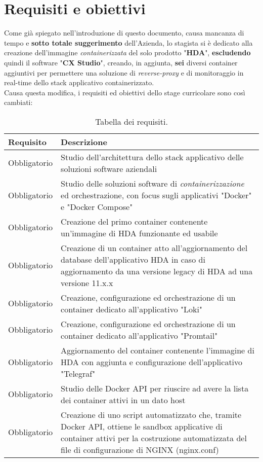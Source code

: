 \section{Requisiti e obiettivi}
Come già spiegato nell'introduzione di questo documento, causa mancanza di tempo e \textbf{sotto totale suggerimento} dell'Azienda, lo stagista si è dedicato alla creazione dell'immagine \textit{containerizzata} del solo prodotto "\textbf{HDA}", \textbf{escludendo} quindi il software "\textbf{CX Studio}", creando, in aggiunta, \textbf{sei} diversi container aggiuntivi per permettere una soluzione di \textit{reverse-proxy} e di monitoraggio in real-time dello stack applicativo containerizzato.\\
Causa questa modifica, i requisiti ed obiettivi dello stage curricolare sono così cambiati:

\begin{table}[h!]
\centering
    \renewcommand{\arraystretch}{1.5}
    \begin{tabular}{|m{}|m{}|} 
    \hline
        \hfil \textbf{Requisito} & \hfil \textbf{Descrizione} \\
    \hline\hline
        \hfil Obbligatorio & Studio dell'architettura dello stack applicativo delle soluzioni software aziendali  \\
    \hline
        \hfil Obbligatorio & Studio delle soluzioni software di \textit{containerizzazione} ed orchestrazione, con focus sugli applicativi "Docker" e "Docker Compose" \\ 
    \hline
        \hfil Obbligatorio & Creazione del primo container contenente un'immagine di HDA funzionante ed usabile \\ 
    \hline
        \hfil Obbligatorio & Creazione di un container atto all'aggiornamento del database dell'applicativo HDA in caso di aggiornamento da una versione legacy di HDA ad una versione 11.x.x \\
    \hline
        \hfil Obbligatorio & Creazione, configurazione ed orchestrazione di un container dedicato all'applicativo "Loki" \\
    \hline
        \hfil Obbligatorio & Creazione, configurazione ed orchestrazione di un container dedicato all'applicativo "Promtail" \\
    \hline
        \hfil Obbligatorio & Aggiornamento del container contenente l'immagine di HDA con aggiunta e configurazione dell'applicativo "Telegraf" \\
    \hline
        \hfil Obbligatorio & Studio delle Docker API per riuscire ad avere la lista dei container attivi in un dato host \\
    \hline
        \hfil Obbligatorio & Creazione di uno script automatizzato che, tramite Docker API, ottiene le sandbox applicative di container attivi per la costruzione automatizzata del file di configurazione di NGINX (nginx.conf) \\
    \hline
    \end{tabular}
\medskip
\caption{Tabella dei requisiti.}
\label{table:tabella dei requisiti in relazione al tempo stabiliti dall'Azienda}
\end{table}

